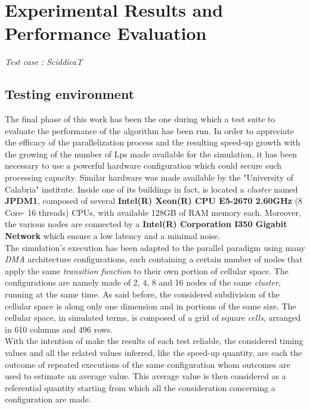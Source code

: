 \documentclass[12pt,a4paper,fleqn]{report}
\begin{document}
\chapter{Experimental Results and Performance Evaluation}{\Large{\textit{Test case : SciddicaT}}}\\
\section{Testing environment}
The final phase of this work has been the one during which a test suite to evaluate the performance of the algorithm has been run. In order to appreciate the efficacy of the parallelization process and the resulting speed-up growth with the growing of the number of Lps made available for the simulation, it has been necessary to use a powerful hardware configuration which could secure such processing capacity. Similar hardware was made available by the "University of Calabria" institute. Inside one of its buildings in fact, is located a \textit{cluster} named \textbf{JPDM1}, composed of several \textbf{Intel(R) Xeon(R) CPU E5-2670 2.60GHz } (8 Core- 16 threads) CPUs, with available 128GB of RAM memory each. Moreover, the various nodes are connected by a \textbf{Intel(R) Corporation I350 Gigabit Network} which ensure a low latency and a minimal noise. \\
The simulation's execution has been adapted to the parallel paradigm using many \textit{DMA} architecture configurations, each containing a certain number of nodes that apply the same \textit{transition function} to their own portion of cellular space. The configurations are namely made of 2, 4, 8 and 16 nodes of the same \textit{cluster}, running at the same time. As said before, the considered subdivision of the cellular space is along only one dimension and in portions of the same size. The cellular space, in simulated terms, is composed of a grid of square \textit{cells}, arranged in 610 columns and 496 rows. \\
With the intention of make the results of each test reliable, the considered timing values and all the related values inferred, like the speed-up quantity, are each the outcome of repeated executions of the same configuration whom outcomes are used to estimate an average value. This average value is then considered as a referential quantity starting from which all the consideration concerning a configuration are made.
\end{document}
